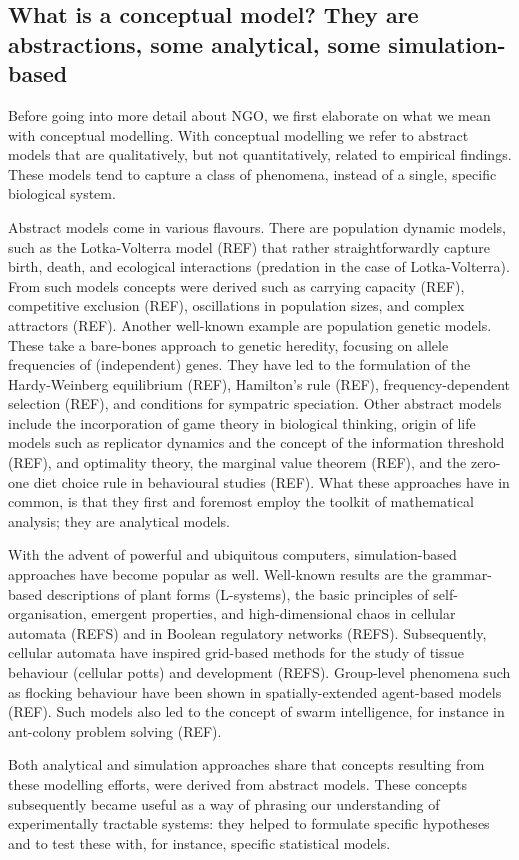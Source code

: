 \subsection{What is a conceptual model? They are abstractions, some analytical, some simulation-based}

Before going into more detail about NGO, we first elaborate on what we mean with conceptual modelling. With conceptual modelling we refer to abstract models that are qualitatively, but not quantitatively, related to empirical findings. These models tend to capture a class of phenomena, instead of a single, specific biological system.

Abstract models come in various flavours. There are population dynamic models, such as the Lotka-Volterra model (REF) that rather straightforwardly capture birth, death, and ecological interactions (predation in the case of Lotka-Volterra). From such models concepts were derived such as carrying capacity (REF), competitive exclusion (REF), oscillations in population sizes, and complex attractors (REF). Another well-known example are population genetic models. These take a bare-bones approach to genetic heredity, focusing on allele frequencies of (independent) genes. They have led to the formulation of the Hardy-Weinberg equilibrium (REF), Hamilton’s rule (REF), frequency-dependent selection (REF), and conditions for sympatric speciation. Other abstract models include the incorporation of game theory in biological thinking, origin of life models such as replicator dynamics and the concept of the information threshold (REF), and optimality theory, the marginal value theorem (REF), and the zero-one diet choice rule in behavioural studies (REF). What these approaches have in common, is that they first and foremost employ the toolkit of mathematical analysis; they are analytical models.

With the advent of powerful and ubiquitous computers, simulation-based approaches have become popular as well. Well-known results are the grammar-based descriptions of plant forms (L-systems), the basic principles of self-organisation, emergent properties, and high-dimensional chaos in cellular automata (REFS) and in Boolean regulatory networks (REFS). Subsequently, cellular automata have inspired grid-based methods for the study of tissue behaviour (cellular potts) and development (REFS). Group-level phenomena such as flocking behaviour have been shown in spatially-extended agent-based models (REF). Such models also led to the concept of swarm intelligence, for instance in ant-colony problem solving (REF).

Both analytical and simulation approaches share that concepts resulting from these modelling efforts, were derived from abstract models. These concepts subsequently became useful as a way of phrasing our understanding of experimentally tractable systems: they helped to formulate specific hypotheses and to test these with, for instance, specific statistical models.
  